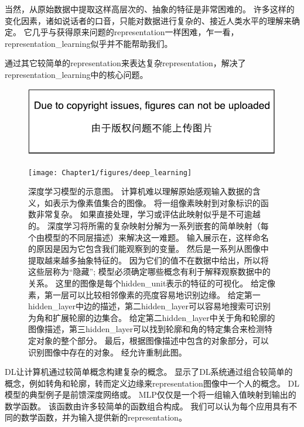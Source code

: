 当然，从原始数据中提取这样高层次的、抽象的特征是非常困难的。
许多这样的变化因素，诸如说话者的口音，只能对数据进行复杂的、接近人类水平的理解来确定。
它几乎与获得原来问题的\gls{representation}一样困难，乍一看，\gls{representation_learning}似乎并不能帮助我们。

通过其它较简单的\gls{representation}来表达复杂\gls{representation}，解决了\gls{representation_learning}中的核心问题。

\begin{figure}[!htb]
\ifOpenSource
\centerline{\includegraphics{figure.pdf}}
\else
\centerline{\texttt{[image: Chapter1/figures/deep\_learning]}}
\fi
\caption{深度学习模型的示意图。 计算机难以理解原始感观输入数据的含义，如表示为像素值集合的图像。
将一组像素映射到对象标识的函数非常复杂。
如果直接处理，学习或评估此映射似乎是不可逾越的。
深度学习将所需的复杂映射分解为一系列嵌套的简单映射（每个由模型的不同层描述）来解决这一难题。
输入展示在，这样命名的原因是因为它包含我们能观察到的变量。
然后是一系列从图像中提取越来越多抽象特征的。
因为它们的值不在数据中给出，所以将这些层称为``隐藏''; 模型必须确定哪些概念有利于解释观察数据中的关系。
这里的图像是每个\gls{hidden_unit}表示的特征的可视化。
给定像素，第一层可以比较相邻像素的亮度容易地识别边缘。
给定第一\gls{hidden_layer}中边的描述，第二\gls{hidden_layer}可以容易地搜索可识别为角和扩展轮廓的边集合。
给定第二\gls{hidden_layer}中关于角和轮廓的图像描述，第三\gls{hidden_layer}可以找到轮廓和角的特定集合来检测特定对象的整个部分。
最后，根据图像描述中包含的对象部分，可以识别图像中存在的对象。
经\citet{ZeilerFergus14}允许重制此图。
}
\label{fig:chap1_deep_learning}
\end{figure}

\gls{DL}让计算机通过较简单概念构建复杂的概念。
显示了\gls{DL}系统通过组合较简单的概念，例如转角和轮廓，转而定义边缘来\gls{representation}图像中一个人的概念。
\gls{DL}模型的典型例子是前馈深度网络或。
\gls{MLP}仅仅是一个将一组输入值映射到输出的数学函数。
该函数由许多较简单的函数组合构成。
我们可以认为每个应用具有不同的数学函数，并为输入提供新的\gls{representation}。

